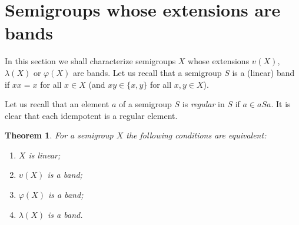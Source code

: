 \documentclass{amsart}
\newtheorem{theorem}[lem]{Theorem}
\theoremstyle{definition}
\begin{document}
\section{Semigroups whose extensions are bands}

In this section we shall characterize semigroups $X$ whose extensions ${\upsilon}(X)$, $\lambda(X)$ or $\varphi(X)$ are bands.
Let us recall that a semigroup $S$ is a (linear) band if $xx=x$ for all $x\in X$ (and $xy\in\{x,y\}$ for all $x,y\in X$).

Let us recall that an element $a$ of a semigroup $S$ is {\em regular} in $S$ if $a\in aSa$. It is clear that each idempotent is a regular element.

\begin{theorem}\label{t1.1} For a semigroup $X$ the following conditions are equivalent:
\begin{enumerate}
\item $X$ is linear;
\item ${\upsilon}(X)$ is a band;
\item $\varphi(X)$ is a band;
\item $\lambda(X)$ is a band.
\end{enumerate}
\end{theorem}
\end{document}
